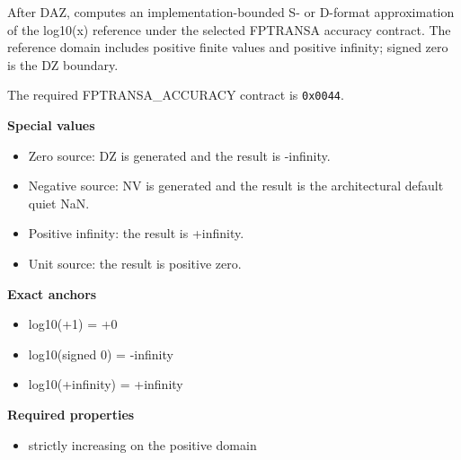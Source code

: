 After DAZ, computes an implementation-bounded S- or D-format approximation of the log10(x) reference under the selected FPTRANSA accuracy contract. The reference domain includes positive finite values and positive infinity; signed zero is the DZ boundary.

The required FPTRANSA\_ACCURACY contract is \texttt{0x0044}.

\textbf{Special values}\par
\begin{itemize}
\item Zero source: DZ is generated and the result is -infinity.
\item Negative source: NV is generated and the result is the architectural default quiet NaN.
\item Positive infinity: the result is +infinity.
\item Unit source: the result is positive zero.
\end{itemize}

\textbf{Exact anchors}\par
\begin{itemize}
\item log10(+1) = +0
\item log10(signed 0) = -infinity
\item log10(+infinity) = +infinity
\end{itemize}

\textbf{Required properties}\par
\begin{itemize}
\item strictly increasing on the positive domain
\end{itemize}
